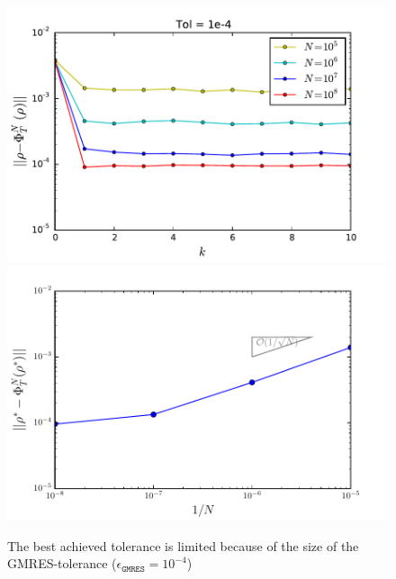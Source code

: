 \begin{figure}[h]
\centering
\includegraphics[width=0.5\linewidth]{../Problems/WeightedParticles/checkSystem/Newton/plots/Newton_sde_res(k)_Dt_e-2_tol1e-2}
\includegraphics[width=0.49\linewidth]{../Problems/WeightedParticles/checkSystem/Newton/plots/Tolerance_on_NK-solution_converges_N-1}

\caption{ The best achieved tolerance is limited because of the size of the GMRES-tolerance ($\epsilon_{\texttt{GMRES}}=10^{-4}$)
}
\label{fig:Newton_sde_res(k)_tol1e-4}
\end{figure}








%
%
%


